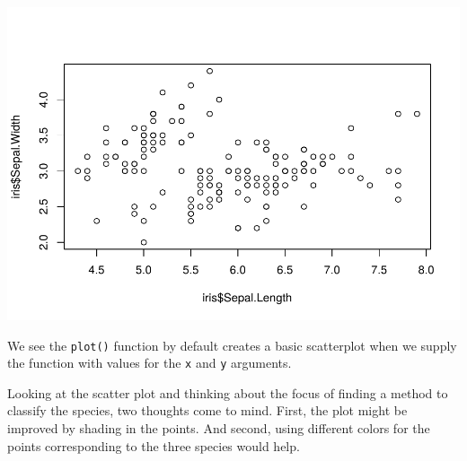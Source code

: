\documentclass[
]{krantz}
\makeatletter
\newenvironment{Shaded}{\begin{snugshade}}{\end{snugshade}}
\newcommand{\DataTypeTok}[1]{\textcolor[rgb]{0.27,0.27,0.27}{#1}}
\newcommand{\DecValTok}[1]{\textcolor[rgb]{0.06,0.06,0.06}{#1}}
\newcommand{\KeywordTok}[1]{\textcolor[rgb]{0.27,0.27,0.27}{\textbf{#1}}}
\newcommand{\NormalTok}[1]{#1}
\newcommand{\OperatorTok}[1]{\textcolor[rgb]{0.43,0.43,0.43}{\textbf{#1}}}
\newcommand{\StringTok}[1]{\textcolor[rgb]{0.5,0.5,0.5}{#1}}
\newenvironment{kframe}{%
\medskip{}
\setlength{\fboxsep}{.8em}
 \def\at@end@of@kframe{}%
 \ifinner\ifhmode%
  \def\at@end@of@kframe{\end{minipage}}%
  \begin{minipage}{\columnwidth}%
 \fi\fi%
 \def\FrameCommand##1{\hskip\@totalleftmargin \hskip-\fboxsep
 \colorbox{shadecolor}{##1}\hskip-\fboxsep
     \hskip-\linewidth \hskip-\@totalleftmargin \hskip\columnwidth}%
 \MakeFramed {\advance\hsize-\width
   \@totalleftmargin\z@ \linewidth\hsize
   \@setminipage}}%
 {\par\unskip\endMakeFramed%
 \at@end@of@kframe}
\renewenvironment{Shaded}{\begin{kframe}}{\end{kframe}}
\makeatother
\begin{document}
\begin{Shaded}
\end{Shaded}

\includegraphics{bookdown_files/figure-latex/unnamed-chunk-334-1.pdf}

We see the \texttt{plot()} function by default creates a basic scatterplot when we supply the function with values for the \texttt{x} and \texttt{y} arguments.

Looking at the scatter plot and thinking about the focus of finding a method to classify the species, two thoughts come to mind. First, the plot might be improved by shading in the points. And second, using different colors for the points corresponding to the three species would help.

\begin{Shaded}
\end{Shaded}
\end{document}
